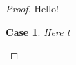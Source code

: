 \documentclass{article}
\newtheorem{case}{Case}
\begin{document}
\meaning\proof
\show\proof
\begin{proof}
  Hello!
  \begin{case}
    Here t
  \end{case}
\end{proof}
\end{document}
